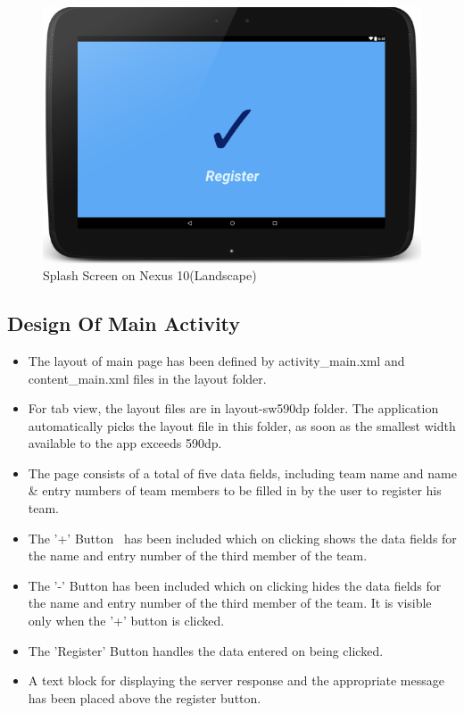 \documentclass{article}
\begin{document}
\begin{figure}[!ht]
	\centering
  \includegraphics[scale=0.8]{./N10-Splash.png}
  \caption{ Splash Screen on Nexus 10(Landscape)}
\end{figure}

\subsection{Design Of Main Activity}
\begin{itemize}
\item The layout of main page has been defined by activity\_main.xml and content\_main.xml files in the layout folder. 
\item For tab view, the layout files are in layout-sw590dp folder. The application automatically picks the layout file in this folder, as soon as the smallest width available to the app exceeds 590dp.
\item The page consists of a total of five data fields, including team name and name \& entry numbers of team members to be filled in by the user to register his team.
\item The '+' Button~\cite{android_button_maker} has been included which on clicking shows the data fields for the name and entry number of the third member of the team.
\item The '-' Button has been included which on clicking hides the data fields for the name and entry number of the third member of the team. It is visible only when the '+' button is clicked.
\item The 'Register' Button handles the data entered on being clicked.
\item A text block for displaying the server response and the appropriate message has been placed above the register button.

\end{itemize} 
\end{document}
